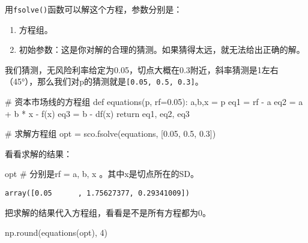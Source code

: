 \documentclass[
  letterpaper,
  DIV=11,
  numbers=noendperiod]{scrreprt}
\newenvironment{Shaded}{\begin{snugshade}}{\end{snugshade}}
\newcommand{\BuiltInTok}[1]{\textcolor[rgb]{0.00,0.23,0.31}{#1}}
\newcommand{\CommentTok}[1]{\textcolor[rgb]{0.37,0.37,0.37}{#1}}
\newcommand{\ControlFlowTok}[1]{\textcolor[rgb]{0.00,0.23,0.31}{#1}}
\newcommand{\DecValTok}[1]{\textcolor[rgb]{0.68,0.00,0.00}{#1}}
\newcommand{\FloatTok}[1]{\textcolor[rgb]{0.68,0.00,0.00}{#1}}
\newcommand{\KeywordTok}[1]{\textcolor[rgb]{0.00,0.23,0.31}{#1}}
\newcommand{\NormalTok}[1]{\textcolor[rgb]{0.00,0.23,0.31}{#1}}
\newcommand{\OperatorTok}[1]{\textcolor[rgb]{0.37,0.37,0.37}{#1}}
\providecommand{\tightlist}{%
  \setlength{\itemsep}{0pt}\setlength{\parskip}{0pt}}\usepackage{longtable,booktabs,array}
\begin{document}
用\texttt{fsolve()}函数可以解这个方程，参数分别是：

\begin{enumerate}
\def\labelenumi{\arabic{enumi}.}
\tightlist
\item
  方程组。
\item
  初始参数：这是你对解的合理的猜测。如果猜得太远，就无法给出正确的解。
\end{enumerate}

我们猜测，无风险利率给定为0.05，切点大概在0.3附近，斜率猜测是1左右（45°），那么我们对p的猜测就是\texttt{{[}0.05,\ 0.5,\ 0.3{]}}。

\begin{Shaded}
\begin{Highlighting}[]
\CommentTok{\# 资本市场线的方程组}
\KeywordTok{def}\NormalTok{ equations(p, rf}\OperatorTok{=}\FloatTok{0.05}\NormalTok{):}
\NormalTok{    a,b,x }\OperatorTok{=}\NormalTok{ p}
\NormalTok{    eq1 }\OperatorTok{=}\NormalTok{ rf }\OperatorTok{{-}}\NormalTok{ a}
\NormalTok{    eq2 }\OperatorTok{=}\NormalTok{ a }\OperatorTok{+}\NormalTok{ b }\OperatorTok{*}\NormalTok{ x }\OperatorTok{{-}}\NormalTok{ f(x)}
\NormalTok{    eq3 }\OperatorTok{=}\NormalTok{ b }\OperatorTok{{-}}\NormalTok{ df(x)}
    \ControlFlowTok{return}\NormalTok{ eq1, eq2, eq3}

\CommentTok{\# 求解方程组}
\NormalTok{opt }\OperatorTok{=}\NormalTok{ sco.fsolve(equations, [}\FloatTok{0.05}\NormalTok{, }\FloatTok{0.5}\NormalTok{, }\FloatTok{0.3}\NormalTok{])}
\end{Highlighting}
\end{Shaded}

看看求解的结果：

\begin{Shaded}
\begin{Highlighting}[]
\NormalTok{opt }\CommentTok{\# 分别是rf = a, b, x 。其中x是切点所在的SD。}
\end{Highlighting}
\end{Shaded}

\begin{verbatim}
array([0.05      , 1.75627377, 0.29341009])
\end{verbatim}

把求解的结果代入方程组，看看是不是所有方程都为0。

\begin{Shaded}
\begin{Highlighting}[]
\NormalTok{np.}\BuiltInTok{round}\NormalTok{(equations(opt), }\DecValTok{4}\NormalTok{)}
\end{Highlighting}
\end{Shaded}
\end{document}
